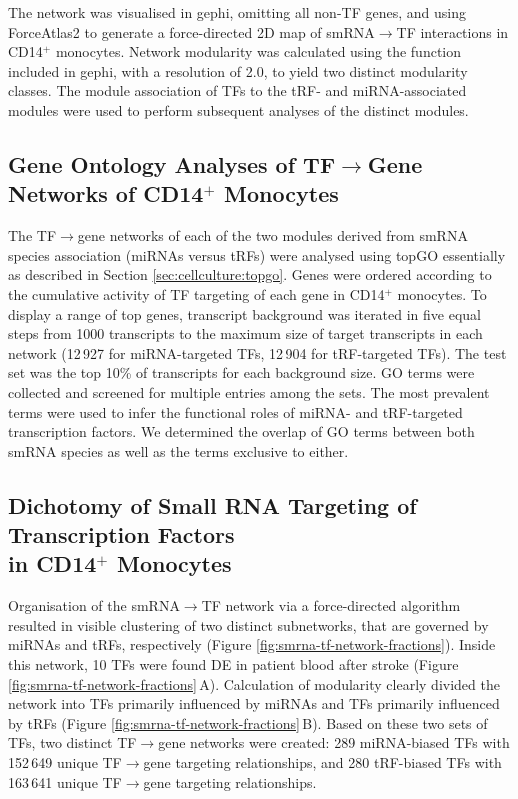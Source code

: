 \begin{method}
The network was visualised in gephi,\cite{Jacomy2014} omitting all non-TF genes, and using ForceAtlas2 to generate a force-directed 2D map of smRNA$\to$TF interactions in CD14$^+$ monocytes. Network modularity was calculated using the function included in gephi, with a resolution of 2.0, to yield two distinct modularity classes. The module association of TFs to the tRF- and miRNA-associated modules were used to perform subsequent analyses of the distinct modules. 

\subsection[Gene Ontology Analyses of TF$\to$Gene Networks\texorpdfstring{\\}{} of CD14$^+$ Monocytes]{Gene Ontology Analyses of TF$\to$Gene Networks of CD14$^+$ Monocytes} \label{sec:stroke:go-cd14}
The TF$\to$gene networks of each of the two modules derived from smRNA species association (miRNAs versus tRFs) were analysed using topGO\cite{Alexa2006} essentially as described in Section \ref{sec:cellculture:topgo}. Genes were ordered according to the cumulative activity of TF targeting of each gene in CD14$^+$ monocytes. To display a range of top genes, transcript background was iterated in five equal steps from 1000 transcripts to the maximum size of target transcripts in each network (12\,927 for miRNA-targeted TFs, 12\,904 for tRF-targeted TFs). The test set was the top 10\% of transcripts for each background size. GO terms were collected and screened for multiple entries among the sets. The most prevalent terms were used to infer the functional roles of miRNA- and tRF-targeted transcription factors. We determined the overlap of GO terms between both smRNA species as well as the terms exclusive to either. 

\end{method}

\subsection{Dichotomy of Small RNA Targeting of Transcription Factors\\ in CD14$^+$ Monocytes}
Organisation of the smRNA$\to$TF network via a force-directed algorithm resulted in visible clustering of two distinct subnetworks, that are governed by miRNAs and tRFs, respectively (Figure \ref{fig:smrna-tf-network-fractions}). Inside this network, 10 TFs were found DE in patient blood after stroke (Figure \ref{fig:smrna-tf-network-fractions}\,A). Calculation of modularity clearly divided the network into TFs primarily influenced by miRNAs and TFs primarily influenced by tRFs (Figure \ref{fig:smrna-tf-network-fractions}\,B). Based on these two sets of TFs, two distinct TF$\to$gene networks were created: 289 miRNA-biased TFs with 152\,649 unique TF$\to$gene targeting relationships, and 280 tRF-biased TFs with 163\,641 unique TF$\to$gene targeting relationships.

